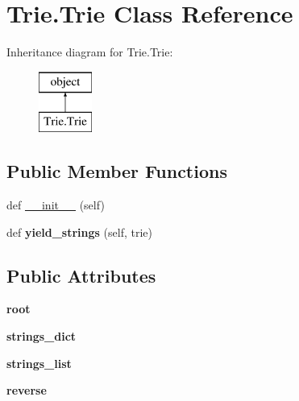 \hypertarget{class_trie_1_1_trie}{}\section{Trie.\+Trie Class Reference}
\label{class_trie_1_1_trie}
Inheritance diagram for Trie.\+Trie\+:\begin{figure}[H]
\begin{center}
\leavevmode
\includegraphics[height=2.000000cm]{class_trie_1_1_trie}
\end{center}
\end{figure}
\subsection*{Public Member Functions}
\begin{DoxyCompactItemize}
\item 
def \mbox{\hyperlink{class_trie_1_1_trie_a9b9de44cd1cfcf4001d34b1c435c0dd0}{\+\_\+\+\_\+init\+\_\+\+\_\+}} (self)
\item 
\mbox{\label{class_trie_1_1_trie_a670d8832bdbe3b2f8f630188b4a3f997}} 
def {\bfseries yield\+\_\+strings} (self, trie)
\end{DoxyCompactItemize}
\subsection*{Public Attributes}
\begin{DoxyCompactItemize}
\item 
\mbox{\label{class_trie_1_1_trie_a323873a709ecdd62ebe123fa9c3abff4}} 
{\bfseries root}
\item 
\mbox{\label{class_trie_1_1_trie_a83967a78c562d8aca0a9f979a14d6c98}} 
{\bfseries strings\+\_\+dict}
\item 
\mbox{\label{class_trie_1_1_trie_aa4cff19308fc0f8647bd6b3fd06fc1af}} 
{\bfseries strings\+\_\+list}
\item 
\mbox{\label{class_trie_1_1_trie_acfbb76a3f77a007fbef4f7e270842f64}} 
{\bfseries reverse}
\end{DoxyCompactItemize}


